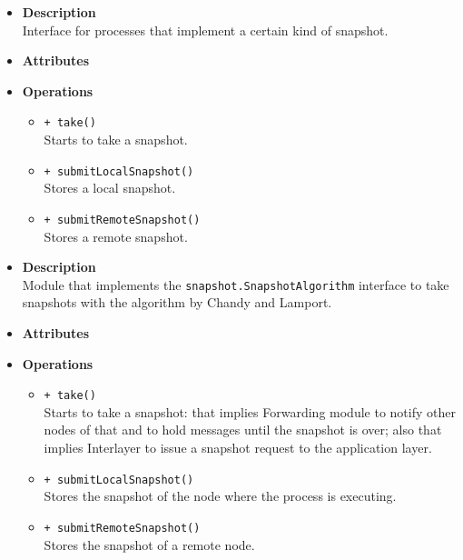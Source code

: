 \FloatBarrier
\begin{itemize}
  \item \textbf{Description} \\
    Interface for processes that implement a certain kind of snapshot.
  \item \textbf{Attributes}
  \item \textbf{Operations}
  \begin{itemize}
    \item \texttt{+ take()} \\
    Starts to take a snapshot.
    \item \texttt{+ submitLocalSnapshot()} \\
    Stores a local snapshot.
    \item \texttt{+ submitRemoteSnapshot()} \\
    Stores a remote snapshot.
  \end{itemize}
\end{itemize}

\FloatBarrier
\begin{itemize}
  \item \textbf{Description} \\
    Module that implements the \texttt{snapshot.SnapshotAlgorithm}
    interface to take snapshots with the algorithm by Chandy and Lamport.
  \item \textbf{Attributes}
  \item \textbf{Operations}
  \begin{itemize}
    \item \texttt{+ take()} \\
    Starts to take a snapshot: that implies Forwarding module to notify
    other nodes of that and to hold messages until the snapshot is over; also
    that implies Interlayer to issue a snapshot request to the application
    layer.
    \item \texttt{+ submitLocalSnapshot()} \\
    Stores the snapshot of the node where the process is executing.
    \item \texttt{+ submitRemoteSnapshot()} \\
    Stores the snapshot of a remote node.
  \end{itemize}
\end{itemize}
